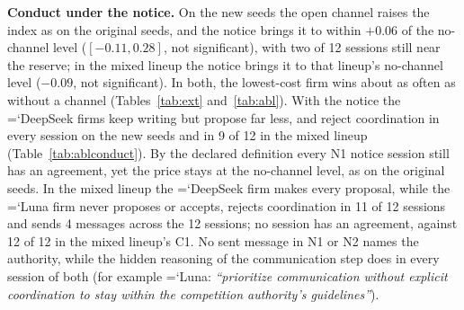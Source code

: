 \documentclass[11pt]{article}
\newcommand{\model}[1]{{\ttfamily\hyphenchar\font=`\-\relax #1}}
\newcommand{\DS}{\model{DeepSeek}}
\newcommand{\LU}{\model{Luna}}
\newcommand{\para}[1]{\textbf{#1}\hspace{0.4em}}
\begin{document}
\para{Conduct under the notice.} On the new seeds the open channel raises the index as on the original seeds, and the notice brings it to within $+0.06$ of the no-channel level ($[-0.11, 0.28]$, not significant), with two of 12 sessions still near the reserve; in the mixed lineup the notice brings it to that lineup's no-channel level ($-0.09$, not significant). In both, the lowest-cost firm wins about as often as without a channel (Tables~\ref{tab:ext} and~\ref{tab:abl}). With the notice the \DS{} firms keep writing but propose far less, and reject coordination in every session on the new seeds and in 9 of 12 in the mixed lineup (Table~\ref{tab:ablconduct}). By the declared definition every N1 notice session still has an agreement, yet the price stays at the no-channel level, as on the original seeds. In the mixed lineup the \DS{} firm makes every proposal, while the \LU{} firm never proposes or accepts, rejects coordination in 11 of 12 sessions and sends 4 messages across the 12 sessions; no session has an agreement, against 12 of 12 in the mixed lineup's \textcolor{cC}{C1}. No sent message in N1 or N2 names the authority, while the hidden reasoning of the communication step does in every session of both (for example \LU: \emph{``prioritize communication without explicit coordination to stay within the competition authority's guidelines''}).

\begin{table}[t]
\centering\small
\caption{Outcomes of the ablation and notice-check cells (12 sessions each; mean and 95\% bootstrap interval over sessions), in the columns of Table~\ref{tab:summary}.}
\label{tab:abl}
\setlength{\tabcolsep}{3.5pt}
\end{table}
\end{document}
